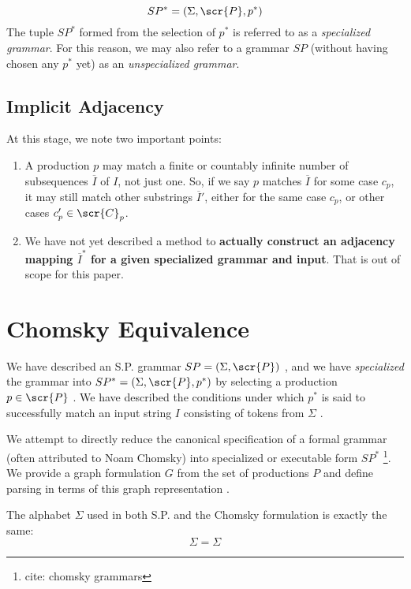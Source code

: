 \documentclass[10pt]{article}
\newcommand{\todocite}[1]{\footnote{cite: #1}}
\begin{document}
\begin{equation}
  \label{eq:specialized}
  SP^* = (\Sigma, \scr{P}, p^*)
\end{equation}
The tuple $SP^*$ formed from the selection of $p^*$ is referred to as a \textit{specialized grammar}. For this reason, we may also refer to a grammar $SP$ (without having chosen any $p^*$ yet) as an \textit{unspecialized grammar}.

\subsection{Implicit Adjacency}
At this stage, we note two important points:
\begin{enumerate}
  \item A production $p$ may match a finite or countably infinite number of subsequences $\overbar{I}$ of $I$, not just one. So, if we say $p$ matches $\overbar{I}$ for some case $c_p$, it may still match other substrings $\overbar{I}'$, either for the same case $c_p$, or other cases $c'_p \in \scr{C}_p$.
  \item We have not yet described a method to \textbf{actually construct an adjacency mapping $\overbar{I}^*$ for a given specialized grammar and input}. That is out of scope for this paper.
\end{enumerate}

\section{Chomsky Equivalence}
\label{sec:chomsky-equivalence}
We have described an S.P. grammar $SP = (\Sigma, \scr{P})$ , and we have \textit{specialized} the grammar into $SP^* = (\Sigma, \scr{P}, p^*)$ by selecting a production $p \in \scr{P}$ . We have described the conditions under which $p^*$ is said to successfully match an input string $I$ consisting of tokens from $\Sigma$ .

We attempt to directly reduce the canonical specification of a formal grammar (often attributed to Noam Chomsky) into specialized or executable form $SP^*$ \todocite{chomsky grammars}. We provide a graph formulation $G$ from the set of productions $P$ and define parsing in terms of this graph representation .

The alphabet $\Sigma$ used in both S.P. and the Chomsky formulation is exactly the same:
\begin{equation}\label{eq:alphabet}
  \Sigma = \Sigma
\end{equation}
\end{document}
